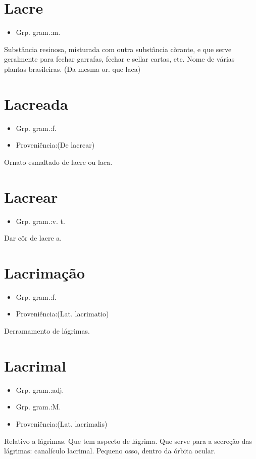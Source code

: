 \section{Lacre}
\begin{itemize}
\item {Grp. gram.:m.}
\end{itemize}
Substância resinosa, misturada com outra substância còrante, e que serve geralmente para fechar garrafas, fechar e sellar cartas, etc.
Nome de várias plantas brasileiras.
(Da mesma or. que \textunderscore laca\textunderscore )
\section{Lacreada}
\begin{itemize}
\item {Grp. gram.:f.}
\end{itemize}
\begin{itemize}
\item {Proveniência:(De \textunderscore lacrear\textunderscore )}
\end{itemize}
Ornato esmaltado de lacre ou laca.
\section{Lacrear}
\begin{itemize}
\item {Grp. gram.:v. t.}
\end{itemize}
Dar côr de lacre a.
\section{Lacrimação}
\begin{itemize}
\item {Grp. gram.:f.}
\end{itemize}
\begin{itemize}
\item {Proveniência:(Lat. \textunderscore lacrimatio\textunderscore )}
\end{itemize}
Derramamento de lágrimas.
\section{Lacrimal}
\begin{itemize}
\item {Grp. gram.:adj.}
\end{itemize}
\begin{itemize}
\item {Grp. gram.:M.}
\end{itemize}
\begin{itemize}
\item {Proveniência:(Lat. \textunderscore lacrimalis\textunderscore )}
\end{itemize}
Relativo a lágrimas.
Que tem aspecto de lágrima.
Que serve para a secreção das lágrimas: \textunderscore canalículo lacrimal\textunderscore .
Pequeno osso, dentro da órbita ocular.
